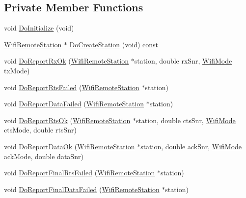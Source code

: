\subsection*{Private Member Functions}
\begin{DoxyCompactItemize}
\item 
void \hyperlink{classns3_1_1MinstrelHtWifiManager_a3c5c32d2a58fb45a922e435192b0cf43}{Do\+Initialize} (void)
\item 
\hyperlink{structns3_1_1WifiRemoteStation}{Wifi\+Remote\+Station} $\ast$ \hyperlink{classns3_1_1MinstrelHtWifiManager_ad661639eb9f121f1e69418e774bbadab}{Do\+Create\+Station} (void) const 
\item 
void \hyperlink{classns3_1_1MinstrelHtWifiManager_afd6cbe29d95df3398dccf513482e9b4e}{Do\+Report\+Rx\+Ok} (\hyperlink{structns3_1_1WifiRemoteStation}{Wifi\+Remote\+Station} $\ast$station, double rx\+Snr, \hyperlink{classns3_1_1WifiMode}{Wifi\+Mode} tx\+Mode)
\item 
void \hyperlink{classns3_1_1MinstrelHtWifiManager_a755d4934c2a8ea5392c23aed6ae85851}{Do\+Report\+Rts\+Failed} (\hyperlink{structns3_1_1WifiRemoteStation}{Wifi\+Remote\+Station} $\ast$station)
\item 
void \hyperlink{classns3_1_1MinstrelHtWifiManager_aa586c8a920a75e94428f44b560aefc7e}{Do\+Report\+Data\+Failed} (\hyperlink{structns3_1_1WifiRemoteStation}{Wifi\+Remote\+Station} $\ast$station)
\item 
void \hyperlink{classns3_1_1MinstrelHtWifiManager_aa92399ed2e169367bbf8ca904a193f1e}{Do\+Report\+Rts\+Ok} (\hyperlink{structns3_1_1WifiRemoteStation}{Wifi\+Remote\+Station} $\ast$station, double cts\+Snr, \hyperlink{classns3_1_1WifiMode}{Wifi\+Mode} cts\+Mode, double rts\+Snr)
\item 
void \hyperlink{classns3_1_1MinstrelHtWifiManager_a62ad32df22d4a75101d001e6e6635559}{Do\+Report\+Data\+Ok} (\hyperlink{structns3_1_1WifiRemoteStation}{Wifi\+Remote\+Station} $\ast$station, double ack\+Snr, \hyperlink{classns3_1_1WifiMode}{Wifi\+Mode} ack\+Mode, double data\+Snr)
\item 
void \hyperlink{classns3_1_1MinstrelHtWifiManager_a9891afb45c6fd574a040dfef9d85014f}{Do\+Report\+Final\+Rts\+Failed} (\hyperlink{structns3_1_1WifiRemoteStation}{Wifi\+Remote\+Station} $\ast$station)
\item 
void \hyperlink{classns3_1_1MinstrelHtWifiManager_a7f0e93d9dccdb7bbbe35ff9b6d117d53}{Do\+Report\+Final\+Data\+Failed} (\hyperlink{structns3_1_1WifiRemoteStation}{Wifi\+Remote\+Station} $\ast$station)
\item 

\end{DoxyCompactItemize}
